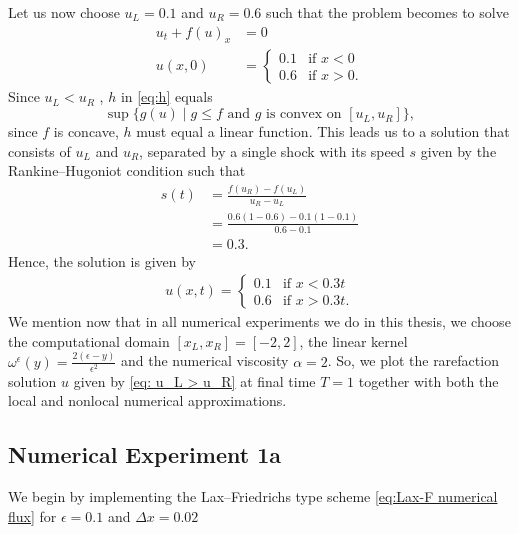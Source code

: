 Let us now choose $u_L = 0.1$ and $u_R = 0.6$ such that the problem becomes to solve
\begin{equation}\label{eq:sloving shocks}
    \begin{split}
        u_{t} + f(u)_{x} & = 0 \\
        u(x,0)           & =
        \begin{cases}
            0.1 & \text{if } x < 0  \\
            0.6 & \text{if } x > 0.
        \end{cases}
    \end{split}
\end{equation}
Since $u_L < u_R $ , $h$ in \eqref{eq:h} equals
\[
    \sup\{ g(u) \mid g \leq f \text{ and } g \text{ is convex on } [u_L, u_R] \},
\]
since $f$ is concave, $h$ must equal a linear function. This leads us to a solution that consists of $u_L$ and $u_R$, separated by a single shock with its speed $s$ given by the Rankine--Hugoniot condition such that
\begin{align*}
    s(t) & = \frac{f(u_R)- f(u_L)}{u_R- u_L}          \\
         & = \frac{0.6(1-0.6) - 0.1(1-0.1) }{0.6-0.1} \\
         & = 0.3.
\end{align*}
Hence, the solution is given by
\begin{equation}\label{eq: u_L < u_R}
    \begin{split}
        u(x,t) =
        \begin{cases}
            0.1 & \text{if } x < 0.3t  \\
            0.6 & \text{if } x > 0.3t.
        \end{cases}
    \end{split}
\end{equation}
We mention now that in all numerical experiments we do in this thesis, we choose the computational domain $[x_L, x_R] = [-2, 2]$, the linear kernel $\omega^{\epsilon}(y) = \frac{2(\epsilon-y)}{\epsilon^2}$  and the numerical viscosity $\alpha = 2$. So, we plot the rarefaction solution $u$ given by \eqref{eq: u_L > u_R} at final time $ T = 1$ together with both the local and nonlocal numerical approximations.

\subsection*{Numerical Experiment 1a}
We begin by implementing the Lax--Friedrichs type scheme \eqref{eq:Lax-F numerical flux} for $\epsilon = 0.1$ and $\Delta x = 0.02$

